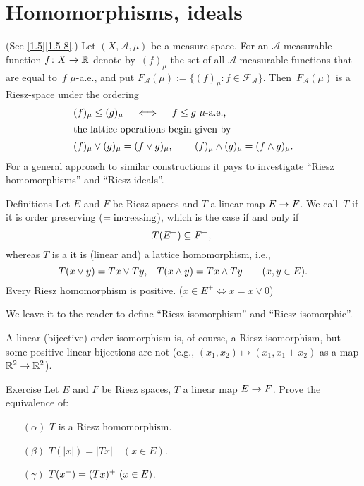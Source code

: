 \documentclass[main.tex]{subfiles}
\begin{document}
\section{Homomorphisms, ideals}
%
%
\begin{psec}{2.1}%
(See \ref{1.5}\ref{1.5-8}.) 
Let $(X,\mathcal A, \mu)$ be a measure space.
For an $\mathcal A$-measurable 
function $f\colon X\rightarrow \mathbb{R}$
denote by~$(f)_\mu$
the set of all $\mathcal A$-measurable functions
that are equal to~$f$ $\mu$-a.e.,
and put 
$F_{\mathcal A}(\mu):=\{(f)_\mu\colon f\in\mathcal{F}_{\mathcal A}\}$.
Then~$F_{\mathcal A}(\mu)$ 
is a Riesz-space
under the ordering
\begin{align*}
& (f)_\mu \leq (g)_\mu \quad \iff \quad f\leq g\ \mu\htam{-a.e.,} \\
\intertext{%
the lattice operations begin given by}%
& (f)_\mu \vee (g)_\mu = (f\vee g)_\mu \htam{, }
  \qquad (f)_\mu \wedge (g)_\mu = (f\wedge g)_\mu
\htam{.}
\end{align*}
For a general approach to similar constructions
it pays to investigate ``Riesz homomorphisms'' 
and ``Riesz ideals''.
\end{psec}
%
%
\begin{psec}{2.2}{Definitions}
Let $E$ and $F$ be Riesz spaces 
and $T$ a linear map $E\rightarrow F$.
We call~$T$  
if it is order preserving ($=\text{increasing}$),
which is the case if and only if
\begin{equation*}
T(E^+) \subseteq F^+\text{, }
\end{equation*}
whereas $T$ is a  
it is (linear and) a 
lattice homomorphism, i.e.,
\begin{equation*}
T(x\vee y) = Tx \vee Ty\text{,}
\quad T(x\wedge y)=Tx\wedge Ty
\qquad (x,y\in E)\text{.}
\end{equation*}
Every Riesz homomorphism is positive. 
($x\in E^+\iff x=x\vee 0$)

We leave it to the reader to define ``Riesz isomorphism''
and ``Riesz isomorphic''.

A linear (bijective) order isomorphism is,
of course,
a Riesz isomorphism,
but some positive linear bijections are not
(e.g., $(x_1,x_2)\mapsto(x_1,x_1+x_2)$ as a map
$\mathbb{R}^2\rightarrow\mathbb{R}^2$).
\end{psec}
%
%
\begin{psec}{2.3}{Exercise}
Let $E$ and $F$ be Riesz spaces,
$T$ a linear map $E\rightarrow F$.
Prove the equivalence of:
\begin{enumerate}
\item[$(\alpha)$]  \label{2.3-alpha}
$T$ is a Riesz homomorphism.
%
\item[$(\beta)$]  \label{2.3-beta}
$T(|x|)=|Tx| \quad (x\in E)$.
%
\item[$(\gamma)$]  \label{2.3-gamma}
$T(x^+) = \lsub{(Tx)^+}{(Tx)} \quad (x\in E)$.
\end{enumerate}
\end{psec}
\end{document}
